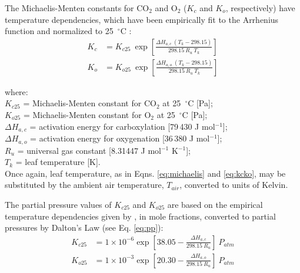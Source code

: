 \documentclass{myreport}
\begin{document}
\noindent The Michaelis-Menten constants for CO$_2$ and O$_2$ ($K_c$ and $K_o$, respectively) have temperature dependencies, which have been empirically fit to the Arrhenius function and normalized to 25~$^\circ$C \parencite{farquhar80}:
%
%
\begin{subequations}
\label{eq:kcko}
\begin{align}
	K_c&=K_{c25}\: \exp \left[ 
    	\frac{\Delta H_{a,c}\: \left(T_k-298.15\right)}{298.15\: R_{u}\: T_k}
    \right] \label{eq:kc} \\
    K_o&=K_{o25}\: \exp \left[ 
    	\frac{\Delta H_{a,o}\: \left(T_k-298.15\right)}{298.15\: R_{u}\: T_k}
    \right] \label{eq:ko}
\end{align}
\end{subequations}

\noindent where:\\
\indent $K_{c25}$ = Michaelis-Menten constant for CO$_2$ at 25~$^{\circ}$C [Pa];\\
\indent $K_{o25}$ = Michaelis-Menten constant for O$_2$ at 25~$^{\circ}$C [Pa];\\
\indent $\Delta H_{a,c}$ = activation energy for carboxylation [79$\,$430 J mol$^{-1}$];\\
\indent $\Delta H_{a,o}$ = activation energy for oxygenation [36$\,$380 J mol$^{-1}$];\\
\indent $R_{u}$ = universal gas constant [8.31447 J mol$^{-1}$ K$^{-1}$];\\
\indent $T_k$ = leaf temperature [K].\\

\noindent Once again, leaf temperature, as in Eqns. \ref{eq:michaelis} and \ref{eq:kcko}, may be substituted by the ambient air temperature, $T_{air}$, converted to units of Kelvin. 

The partial pressure values of $K_{c25}$ and $K_{o25}$ are based on the empirical temperature dependencies given by \cite{bernacchi01}, in mole fractions, converted to partial pressures by Dalton's Law (see Eq. \ref{eq:pp}):
%
%
\begin{subequations}
\label{eq:kcko25}
\begin{align}
	K_{c25}&=1\times 10^{-6} \exp \left[ 38.05 - 
    	\frac{\Delta H_{a,c}}{298.15\: R_{u}}
    \right]\: P_{atm} \label{eq:kc25} \\
    K_{o25}&=1\times 10^{-3} \exp \left[ 20.30 - 
    	\frac{\Delta H_{a,o}}{298.15\: R_{u}}
    \right]\: P_{atm} \label{eq:ko25}
\end{align}
\end{subequations}
\end{document}
